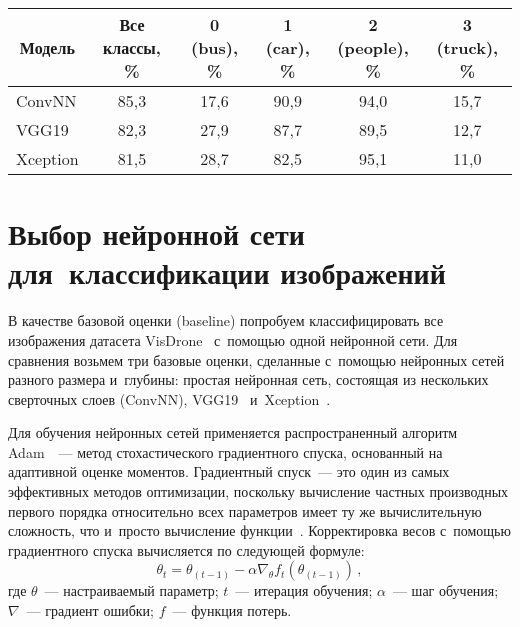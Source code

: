 \begin{multicols}{2}
{}
  
  

\setcounter{table}{3}
\begin{table*}[b]\small %
\vspace*{-9pt}
\begin{center}
\vspace*{2ex}

\begin{tabular}{|l|c|c|c|c|c|}
\hline
  \multicolumn{1}{|c|}{Модель}&Все классы, \%&0 (bus), \%&1 (car), \%&2 (people), \%&3 (truck), \%\\
\hline
  ConvNN&85,3&17,6&90,9&94,0&15,7\\
  VGG19&82,3&27,9&87,7&89,5&12,7\\
  Xception&81,5&28,7&82,5&95,1&11,0\\
  \hline
  \end{tabular}
  \end{center}
  \end{table*}

\vspace*{-3pt}


\section{Выбор нейронной сети для~классификации изображений}
  
  В качестве базовой оценки (baseline) попробуем классифицировать все 
изображения датасета \mbox{VisDrone}~\cite{8-ark} с~по\-мощью одной нейронной сети. 
Для сравнения возьмем три базовые оценки, сделанные с~по\-мощью нейронных 
сетей разного размера и~глубины: прос\-тая нейронная сеть, со\-сто\-ящая из 
нескольких сверточных слоев (ConvNN), VGG19~\cite{9-ark}  
и~Xception~\cite{10-ark}.
  
  Для обучения нейронных сетей применяется распространенный алгоритм 
Adam~\cite{11-ark}~--- метод стохастического градиентного спус\-ка, 
основанный на адап\-тив\-ной оцен\-ке моментов. Градиентный спуск~--- это один 
из самых эффективных методов оптимизации, поскольку вы\-чис\-ле\-ние част\-ных 
производных первого порядка относительно всех па\-ра\-мет\-ров имеет ту же 
вычислительную сложность, что и~прос\-то вы\-чис\-ле\-ние функции~\cite{11-ark}. 
Корректировка весов с~по\-мощью градиентного спуска вы\-чис\-ля\-ет\-ся по 
сле\-ду\-ющей формуле:
  $$
  \theta_t= \theta_{(t-1)} -\alpha \nabla_\theta f_t\left( \theta_{(t-1)}\right)\,,
  $$
где $\theta$~--- настраиваемый параметр; $t$~--- итерация обуче\-ния;  
$\alpha$~--- шаг обуче\-ния; $\nabla$~--- градиент ошиб\-ки; $f$~--- функция 
потерь.
  

\end{multicols}
